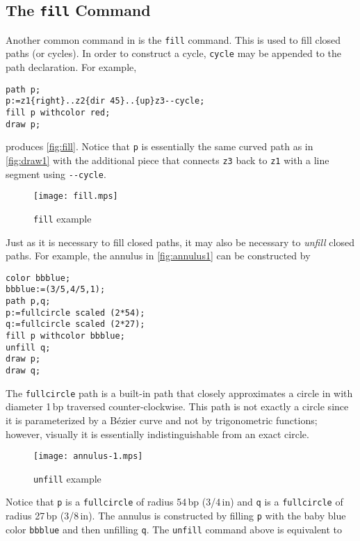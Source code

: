 \subsection{The \texttt{fill} Command}

Another common command in \MP{} is the \texttt{fill} command.  This is
used to fill closed paths (or cycles).  In order to construct a cycle,
\texttt{cycle} may be appended to the path declaration.  For example,

\begin{lstlisting}[xleftmargin=7bp]
path p;
p:=z1{right}..z2{dir 45}..{up}z3--cycle;
fill p withcolor red;
draw p;
\end{lstlisting}
produces \autoref{fig:fill}.  Notice that \texttt{p} is essentially the
same curved path as in \autoref{fig:draw1} with the additional piece
that connects \texttt{z3} back to \texttt{z1} with a line segment using
\texttt{-{}-cycle}.

\begin{figure}
  \centering
  \texttt{[image: fill.mps]}
  \caption{\texttt{fill} example}
  \label{fig:fill}
\end{figure}

Just as it is necessary to fill closed paths, it may also be necessary
to \textit{unfill} closed paths.  For example, the annulus in
\autoref{fig:annulus1} can be constructed by

\begin{lstlisting}[xleftmargin=38bp]
color bbblue;
bbblue:=(3/5,4/5,1);
path p,q;
p:=fullcircle scaled (2*54);
q:=fullcircle scaled (2*27);
fill p withcolor bbblue;
unfill q;
draw p;
draw q;
\end{lstlisting}

The \texttt{fullcircle} path is a built-in path that closely
approximates a circle in \MP{} with diameter 1\,bp traversed
counter-clockwise.  This path is not exactly a circle since it is
parameterized by a B\'{e}zier curve and not by trigonometric functions;
however, visually it is essentially indistinguishable from an exact
circle.

\begin{figure}
  \centering
  \texttt{[image: annulus-1.mps]}
  \caption{\texttt{unfill} example}
  \label{fig:annulus1}
\end{figure}

Notice that \texttt{p} is a \texttt{fullcircle} of radius 54\,bp
(3/4\,in) and \texttt{q} is a \texttt{fullcircle} of radius 27\,bp
(3/8\,in).  The annulus is constructed by filling \texttt{p} with the
baby blue color \texttt{bbblue} and then unfilling \texttt{q}.  The
\texttt{unfill} command above is equivalent to

